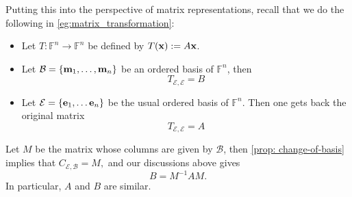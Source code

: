 \medskip
Putting this into the perspective of matrix representations, recall that we do the following in \autoref{eg:matrix_transformation}:
\begin{itemize}
    \item Let $T: \mathbb{F}^n \to \mathbb{F}^n$ be defined by $T({\bf x}) := A{\bf x}$. 
    \item Let $\mathcal{B} = \{{\bf m}_1, \dots, {\bf m}_n\}$ be an ordered basis of $\mathbb{F}^n$, then
    $$T_{\mathcal{E},\mathcal{E}} = B$$
    \item Let $\mathcal{E} = \{{\bf e}_1, \dots {\bf e}_n\}$ be the usual ordered basis of $\mathbb{F}^n$. Then one gets back the original matrix 
    $$T_{\mathcal{E},\mathcal{E}} = A$$
\end{itemize}
Let $M$ be the matrix whose columns are given by $\mathcal{B}$, then \autoref{prop: change-of-basis} implies that $C_{\mathcal{E},\mathcal{B}} = M,$
and our discussions above gives
    \[B = M^{-1}AM.\]
In particular, $A$ and $B$ are similar.

